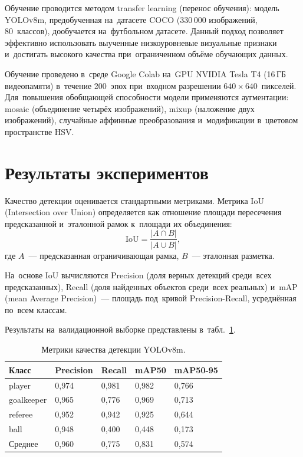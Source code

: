 \documentclass{stud-conf-pmk}
\begin{document}
\begin{paper}
Обучение проводится методом transfer learning (перенос обучения): модель YOLOv8m, предобученная на~датасете COCO (330\,000 изображений, 80~классов), дообучается на~футбольном датасете. Данный подход позволяет эффективно использовать выученные низкоуровневые визуальные признаки и~достигать высокого качества при~ограниченном объёме обучающих данных.

Обучение проведено в~среде Google Colab на~GPU NVIDIA Tesla T4 (16\,ГБ видеопамяти) в~течение 200~эпох при~входном разрешении $640 \times 640$~пикселей. Для~повышения обобщающей способности модели применяются аугментации: mosaic (объединение четырёх изображений), mixup (наложение двух изображений), случайные аффинные преобразования и~модификации в~цветовом пространстве HSV.


\section{Результаты экспериментов}

Качество детекции оценивается стандартными метриками. Метрика IoU (Intersection over Union) определяется как отношение площади пересечения предсказанной и~эталонной рамок к~площади их объединения:
$$\text{IoU} = \frac{|A \cap B|}{|A \cup B|},$$
где $A$~--- предсказанная ограничивающая рамка, $B$~--- эталонная разметка.

На~основе IoU вычисляются Precision (доля верных детекций среди~всех предсказанных), Recall (доля найденных объектов среди~всех реальных) и~mAP (mean Average Precision)~--- площадь под~кривой Precision-Recall, усреднённая по~всем классам.

Результаты на~валидационной выборке представлены в~табл.~\ref{tab:metrics}.

\begin{table}
\centering
\caption{Метрики качества детекции YOLOv8m.}
\begin{tabular}{|l|l|l|l|l|}
\hline
Класс & Precision & Recall & mAP50 & mAP50-95 \\
\hline
player     & 0{,}974 & 0{,}981 & 0{,}982 & 0{,}766 \\
\hline
goalkeeper & 0{,}965 & 0{,}776 & 0{,}969 & 0{,}713 \\
\hline
referee    & 0{,}952 & 0{,}942 & 0{,}925 & 0{,}644 \\
\hline
ball       & 0{,}948 & 0{,}400 & 0{,}448 & 0{,}173 \\
\hline
Среднее    & 0{,}960 & 0{,}775 & 0{,}831 & 0{,}574 \\
\hline
\end{tabular}
\label{tab:metrics}
\end{table}


\end{paper}
\end{document}
